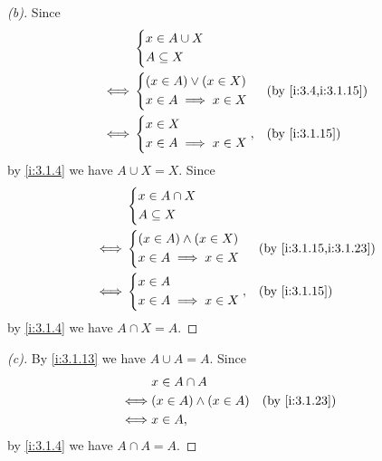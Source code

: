 \begin{proof}[(b)]
  Since
  \begin{align*}
         & \begin{dcases}
             x \in A \cup X \\
             A \subseteq X
           \end{dcases}                        \\
    \iff & \begin{dcases}
             (x \in A) \lor (x \in X) \\
             x \in A \implies x \in X
           \end{dcases} &  & \by{i:3.4,i:3.1.15} \\
    \iff & \begin{dcases}
             x \in X \\
             x \in A \implies x \in X
           \end{dcases},    &  & \by{i:3.1.15}
  \end{align*}
  by \cref{i:3.1.4} we have \(A \cup X = X\).
  Since
  \begin{align*}
         & \begin{dcases}
             x \in A \cap X \\
             A \subseteq X
           \end{dcases}                           \\
    \iff & \begin{dcases}
             (x \in A) \land (x \in X) \\
             x \in A \implies x \in X
           \end{dcases} &  & \by{i:3.1.15,i:3.1.23} \\
    \iff & \begin{dcases}
             x \in A \\
             x \in A \implies x \in X
           \end{dcases},     &  & \by{i:3.1.15}
  \end{align*}
  by \cref{i:3.1.4} we have \(A \cap X = A\).
\end{proof}

\begin{proof}[(c)]
  By \cref{i:3.1.13} we have \(A \cup A = A\).
  Since
  \begin{align*}
         & x \in A \cap A                               \\
    \iff & (x \in A) \land (x \in A) &  & \by{i:3.1.23} \\
    \iff & x \in A,
  \end{align*}
  by \cref{i:3.1.4} we have \(A \cap A = A\).
\end{proof}

